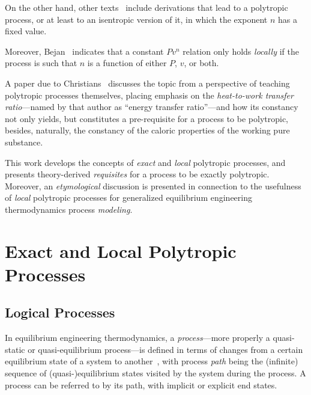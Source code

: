 \documentclass[fleqn,10pt]{SelfArx}
\begin{document}
    On  the  other  hand,  other  texts~\cite{1986-JonesJB+HawkinsGA-Wiley,   2006-BejanA-Wiley,
    2015-KroosKA+PotterMC-Cengage} include derivations that lead to a polytropic process, or  at
    least to an isentropic version of it, in which the exponent $n$ has a fixed value.

    Moreover, Bejan~\cite[p.~175]{2006-BejanA-Wiley} indicates that a constant  $Pv^n$  relation
    only holds \emph{locally} if the process is such that $n$ is a function of either $P$,  $v$,
    or both.

    A paper due to Christians~\cite{2012-ChristiansJ-IntJMechEngEduc} discusses the topic from a
    perspective  of  teaching  polytropic  processes  themselves,  placing   emphasis   on   the
    \emph{heat-to-work transfer ratio}---named by that author as ``energy transfer ratio''---and
    how its constancy not only yields, but constitutes a  pre-requisite  for  a  process  to  be
    polytropic, besides, naturally, the constancy of the caloric properties of the working  pure
    substance.

    This work develops the concepts of \emph{exact} and \emph{local} polytropic  processes,  and
    presents theory-derived \emph{requisites} for a process to be exactly polytropic.  Moreover,
    an  \emph{etymological}  discussion  is  presented  in  connection  to  the  usefulness   of
    \emph{local} polytropic processes for  generalized  equilibrium  engineering  thermodynamics
    process \emph{modeling}.

\section{Exact and Local Polytropic Processes}

    \subsection{Logical Processes}

    In equilibrium engineering thermodynamics, a \emph{process}---more properly  a  quasi-static
    or quasi-equilibrium process---is defined in terms of changes  from  a  certain  equilibrium
    state of a system to  another~\cite{2013-CengelYA+BolesMA-AMGH},  with  process  \emph{path}
    being the (infinite) sequence of (quasi-)equilibrium states visited by the system during the
    process. A process can be referred to by its path, with implicit or explicit end states.
\end{document}
